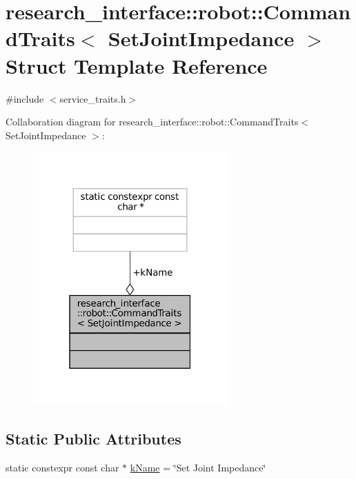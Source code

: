 \hypertarget{structresearch__interface_1_1robot_1_1CommandTraits_3_01SetJointImpedance_01_4}{}\section{research\+\_\+interface\+:\+:robot\+:\+:Command\+Traits$<$ Set\+Joint\+Impedance $>$ Struct Template Reference}
\label{structresearch__interface_1_1robot_1_1CommandTraits_3_01SetJointImpedance_01_4}


{\ttfamily \#include $<$service\+\_\+traits.\+h$>$}



Collaboration diagram for research\+\_\+interface\+:\+:robot\+:\+:Command\+Traits$<$ Set\+Joint\+Impedance $>$\+:
\nopagebreak
\begin{figure}[H]
\begin{center}
\leavevmode
\includegraphics[width=211pt]{structresearch__interface_1_1robot_1_1CommandTraits_3_01SetJointImpedance_01_4__coll__graph}
\end{center}
\end{figure}
\subsection*{Static Public Attributes}
\begin{DoxyCompactItemize}
\item 
static constexpr const char $\ast$ \hyperlink{structresearch__interface_1_1robot_1_1CommandTraits_3_01SetJointImpedance_01_4_ad52268e744349a219c04f2fd456ee717}{k\+Name} = \char`\"{}Set Joint Impedance\char`\"{}
\end{DoxyCompactItemize}


